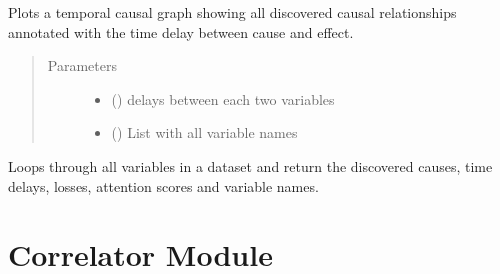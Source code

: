 \documentclass[letterpaper,10pt,english]{sphinxmanual}
\begin{document}
\begin{fulllineitems}
\begin{fulllineitems}
\label{\detokenize{causations:causations.Causations.plotgraph}}
\sphinxAtStartPar
Plots a temporal causal graph showing all discovered causal relationships annotated with the time delay between cause and effect.
\begin{quote}\begin{description}
\item[{Parameters}] \leavevmode\begin{itemize}
\item {} 
\sphinxAtStartPar
{} () \textendash{} delays between each two variables

\item {} 
\sphinxAtStartPar
{} () \textendash{} List with all variable names

\end{itemize}

\end{description}\end{quote}

\end{fulllineitems}


\begin{fulllineitems}
\label{\detokenize{causations:causations.Causations.runTCDF}}
\sphinxAtStartPar
Loops through all variables in a dataset and return the discovered causes, time delays, losses, attention scores and variable names.

\end{fulllineitems}


\end{fulllineitems}



\chapter{Correlator  Module}
\label{\detokenize{correlator:module-correlator}}\label{\detokenize{correlator:correlator-module}}\label{\detokenize{correlator::doc}}
\end{document}
